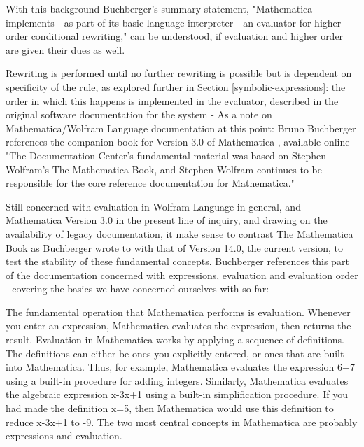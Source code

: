 
With this background Buchberger's summary statement, "Mathematica implements - as part of its basic language interpreter - an evaluator for higher order conditional rewriting," \cite[p. 8]{buchberger_mathematica_1996} can be understood, if evaluation and higher order are given their dues as well. 

Rewriting is performed until no further rewriting is possible but is dependent on specificity of the rule, as explored further in Section \ref{symbolic-expressions}: the order in which this happens is implemented in the evaluator, described in the original software documentation for the system - As a note on Mathematica/Wolfram Language documentation at this point: Bruno Buchberger references the companion book for Version 3.0 of Mathematica \cite{noauthor_wolfram_nodate}, available online - "The Documentation Center’s fundamental material was based on Stephen Wolfram’s The Mathematica Book, and Stephen Wolfram continues to be responsible for the core reference documentation for Mathematica." \cite{noauthor_mathematica_nodate}

Still concerned with evaluation in Wolfram Language in general, and Mathematica Version 3.0 in the present line of inquiry, and drawing on the availability of legacy documentation, it make sense to contrast The Mathematica Book as Buchberger wrote to with that of Version 14.0, the current version, to test the stability of these fundamental concepts. Buchberger references this part of the documentation concerned with expressions, evaluation and evaluation order - covering the basics we have concerned ourselves with so far:

\begin{displayquote}
The fundamental operation that Mathematica performs is evaluation. Whenever you enter an expression, Mathematica evaluates the expression, then returns the result. 
Evaluation in Mathematica works by applying a sequence of definitions. The definitions can either be ones you explicitly entered, or ones that are built into Mathematica. 
Thus, for example, Mathematica evaluates the expression 6+7 using a built-in procedure for adding integers. Similarly, Mathematica evaluates the algebraic expression x-3x+1 using a built-in simplification procedure. If you had made the definition x=5, then Mathematica would use this definition to reduce x-3x+1 to -9. 
The two most central concepts in Mathematica are probably expressions and evaluation.
\cite[2.5.1 Principles of Evaluation]{noauthor_wolfram_nodate}
\end{displayquote}

